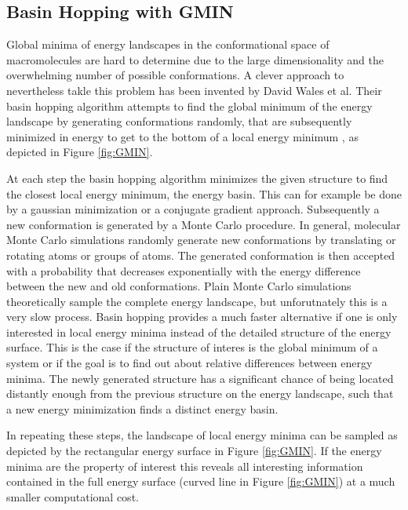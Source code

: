 \documentclass[english, a4paper, 12pt, titlepage, draft]{article}
\begin{document}



\subsection{Basin Hopping with GMIN}

Global minima of energy landscapes in the conformational space of macromolecules are hard to determine due to the large dimensionality and the overwhelming number of possible conformations.
A clever approach to nevertheless takle this problem has been invented by David Wales et al.
Their basin hopping algorithm attempts to find the global minimum of the energy landscape by generating conformations randomly, that are subsequently minimized in energy to get to the bottom of a local energy minimum \cite{basinHopping}, as depicted in Figure \ref{fig:GMIN}.

At each step the basin hopping algorithm minimizes the given structure to find the closest local energy minimum, the energy basin.
This can for example be done by a gaussian minimization or a conjugate gradient approach.
Subsequently a new conformation is generated by a Monte Carlo procedure. 
In general, molecular Monte Carlo simulations randomly generate new conformations by translating or rotating atoms or groups of atoms.
The generated conformation is then accepted with a probability that decreases exponentially with the energy difference between the new and old conformations.
Plain Monte Carlo simulations theoretically sample the complete energy landscape, but unforutnately this is a very slow process.
Basin hopping provides a much faster alternative if one is only interested in local energy minima instead of the detailed structure of the energy surface.
This is the case if the structure of interes is the global minimum of a system or if the goal is to find out about relative differences between energy minima.
The newly generated structure has a significant chance of being located distantly enough from the previous structure on the energy landscape, such that a new energy minimization finds a distinct energy basin.

In repeating these steps, the landscape of local energy minima can be sampled as depicted by the rectangular energy surface in Figure \ref{fig:GMIN}.
If the energy minima are the property of interest this reveals all interesting information contained in the full energy surface (curved line in Figure \ref{fig:GMIN}) at a much smaller computational cost.
\end{document}
